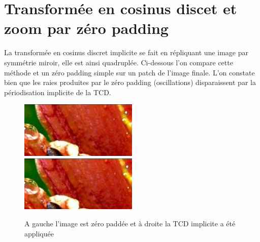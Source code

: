 \documentclass{article}
\begin{document}
\section{Transformée en cosinus discet et zoom par zéro padding}
La transformée en cosinus discret implicite se fait en répliquant une image par symmétrie miroir, elle est ainsi quadruplée. Ci-dessous l'on compare cette méthode et un zéro padding simple sur un patch de l'image finale. L'on constate bien que les raies produites par le zéro padding (oscillations) disparaissent par la périodisation implicite de la TCD.

\begin{figure}[h]
	\includegraphics[width=0.50\textwidth]{flowersZerPad.png}
	\includegraphics[width=0.50\textwidth]{flowersTCD.png}
  \caption{A gauche l'image est zéro paddée et à droite la TCD implicite a été appliquée}
\end{figure}
\end{document}
